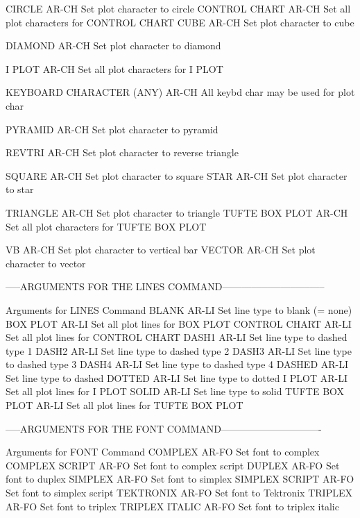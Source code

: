 CIRCLE                      AR-CH Set plot character to circle
CONTROL CHART               AR-CH Set all plot characters for CONTROL CHART
CUBE                        AR-CH Set plot character to cube

DIAMOND                     AR-CH Set plot character to diamond

I PLOT                      AR-CH Set all plot characters for I PLOT

KEYBOARD CHARACTER (ANY)    AR-CH All keybd char may be used for plot char

PYRAMID                     AR-CH Set plot character to pyramid

REVTRI                      AR-CH Set plot character to reverse triangle

SQUARE                      AR-CH Set plot character to square
STAR                        AR-CH Set plot character to star

TRIANGLE                    AR-CH Set plot character to triangle
TUFTE BOX PLOT              AR-CH Set all plot characters for TUFTE BOX PLOT

VB                          AR-CH Set plot character to vertical bar
VECTOR                      AR-CH Set plot character to vector

-----ARGUMENTS FOR THE LINES COMMAND--------------------------------

Arguments for LINES Command
BLANK                       AR-LI Set line type to blank (= none)
BOX PLOT                    AR-LI Set all plot lines for BOX PLOT
CONTROL CHART               AR-LI Set all plot lines for CONTROL CHART
DASH1                       AR-LI Set line type to dashed type 1
DASH2                       AR-LI Set line type to dashed type 2
DASH3                       AR-LI Set line type to dashed type 3
DASH4                       AR-LI Set line type to dashed type 4
DASHED                      AR-LI Set line type to dashed
DOTTED                      AR-LI Set line type to dotted
I PLOT                      AR-LI Set all plot lines for I PLOT
SOLID                       AR-LI Set line type to solid
TUFTE BOX PLOT              AR-LI Set all plot lines for TUFTE BOX PLOT

-----ARGUMENTS FOR THE FONT COMMAND-------------------------------

Arguments for FONT Command
COMPLEX                     AR-FO Set font to complex
COMPLEX SCRIPT              AR-FO Set font to complex script
DUPLEX                      AR-FO Set font to duplex
SIMPLEX                     AR-FO Set font to simplex
SIMPLEX SCRIPT              AR-FO Set font to simplex script
TEKTRONIX                   AR-FO Set font to Tektronix
TRIPLEX                     AR-FO Set font to triplex
TRIPLEX ITALIC              AR-FO Set font to triplex italic


